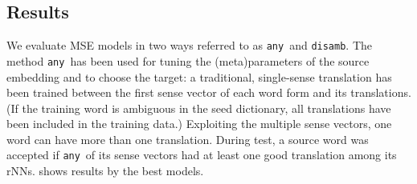 \documentclass[11pt]{article}
\begin{document}
\subsection{Results}

\newcommand{\any}{\texttt{any}}
\newcommand{\disamb}{\texttt{disamb}}

We evaluate MSE models in two ways referred to as \any~and \disamb.  The method
\any~has been used for tuning the (meta)parameters of the source embedding and
to choose the target: a traditional, single-sense translation has been trained
between the first  sense vector of each word form and its
translations. (If the training word is ambiguous in the seed dictionary, all
translations have been included in the training data.)  Exploiting the multiple
sense vectors, one word can have more than one translation.  During test, a
source word was accepted if \any~of its sense vectors had at
least one good translation among its  rNNs.  shows results by
the best models.
\end{document}
